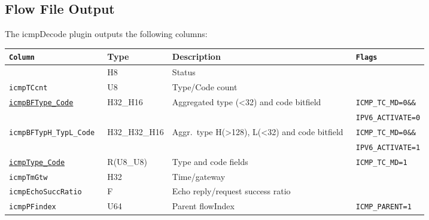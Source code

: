 \documentclass[documentation]{subfiles}
\begin{document}
\subsection{Flow File Output}
The icmpDecode plugin outputs the following columns:
\begin{longtable}{>{\tt}lll>{\tt\small}l}
    \toprule
    {\bf Column}                                & {\bf Type}    & {\bf Description}                             & {\bf Flags}\\
    \midrule\endhead%
    \nameref{icmpStat}                          & H8            & Status                                        & \\
    icmpTCcnt                                   & U8            & Type/Code count                               & \\
    \hyperref[icmpBFTypeCode]{icmpBFType\_Code} & H32\_H16      & Aggregated type (<32) and code bitfield       & ICMP\_TC\_MD=0\&\&\\
                                                &               &                                               & IPV6\_ACTIVATE=0\\
    icmpBFTypH\_TypL\_Code                      & H32\_H32\_H16 & Aggr.\ type H(>128), L(<32) and code bitfield & ICMP\_TC\_MD=0\&\&\\
                                                &               &                                               & IPV6\_ACTIVATE=1\\
    \hyperref[icmpBFTypeCode]{icmpType\_Code}   & R(U8\_U8)     & Type and code fields                          & ICMP\_TC\_MD=1\\
    icmpTmGtw                                   & H32           & Time/gateway                                  & \\
    icmpEchoSuccRatio                           & F             & Echo reply/request success ratio              & \\
    icmpPFindex                                 & U64           & Parent flowIndex                              & ICMP\_PARENT=1\\
    \bottomrule
\end{longtable}
\newpage
\end{document}
